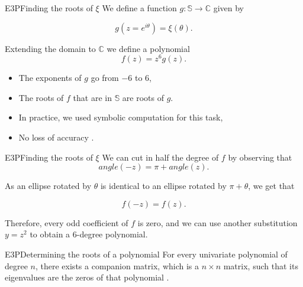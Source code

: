 \documentclass{beamer}
\theoremstyle{definition}
\begin{document}
\begin{frame}{E3P}{Finding the roots of $\xi$}
	We define a function $g \colon \mathbb{S} \to \mathbb{C}$ given by
	
	\begin{equation*}
	g(z=e^{i\theta}) = \xi(\theta).
	\end{equation*}
	
	Extending the domain to $\mathbb{C}$ we define a polynomial 
	$$f(z) = z^6 g(z).$$
	\begin{itemize}
		\item The exponents of $g$ go from $-6$ to $6$,
		\item The roots of $f$ that are in $\mathbb{S}$ are roots of $g$.
		\item In practice, we used symbolic computation for this task,
		\item No loss of accuracy \cite{weidner}.
	\end{itemize}
\end{frame}

\begin{frame}{E3P}{Finding the roots of $\xi$}
	We can cut in half the degree of $f$ by observing that
	\begin{equation*}
	angle(-z)=\pi+angle(z).
	\end{equation*}
	
	As an ellipse rotated by $\theta$ is identical to an ellipse rotated by $\pi + \theta$, we get that
	
	$$f(-z) = f(z).$$
	
	Therefore, every odd coefficient of $f$ is zero, and we can use another substitution $y=z^2$ to obtain a $6$-degree polynomial.
\end{frame}

\begin{frame}{E3P}{Determining the roots of a polynomial}
	For every univariate polynomial of degree $n$, there exists a companion matrix, which is a $n\times n$ matrix, such that its eigenvalues are the zeros of that polynomial \cite[p.~195]{horn}.
	

\end{frame}
\end{document}
